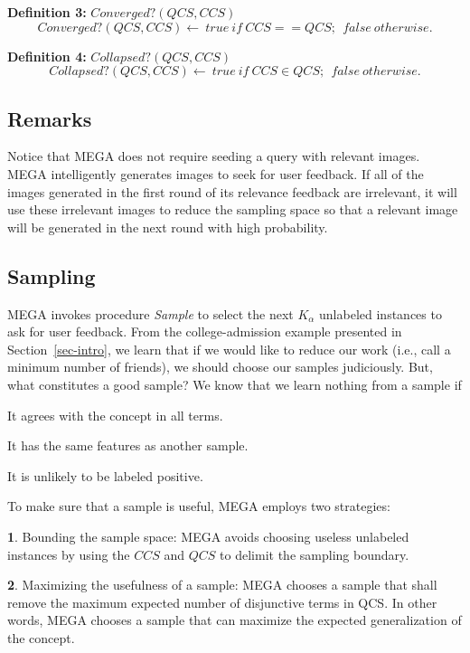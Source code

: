\vspace{.1in}
\sspace
\noindent
{\bf Definition 3:} $Converged?(QCS, CCS)$
\[
Converged?(QCS, CCS) \leftarrow~true~if~CCS == QCS;~~false~otherwise.
\]

\noindent
{\bf Definition 4:} $Collapsed?(QCS, CCS)$
\[
Collapsed?(QCS, CCS) \leftarrow~true~if~CCS \in QCS;~~false~otherwise.
\]
\nspace

\subsection*{Remarks}

Notice that MEGA does not require seeding a
query with relevant images.  MEGA intelligently generates
images to seek for user feedback.
If all of the images
generated in the first round of its relevance feedback are irrelevant,
it will use these irrelevant images to reduce
the sampling space
so that a relevant image will be
generated in the next round with high probability.
                                                      

\subsection{Sampling}
\label{sec-sampling}

MEGA invokes procedure {\it Sample}
to select the next $K_{\alpha}$ unlabeled instances
to ask for user feedback. From the 
college-admission example presented in Section~\ref{sec-intro}, we
learn that if we would like to reduce our work (i.e.,
call a minimum number of friends), we should choose
our samples judiciously. 
But, what constitutes a good sample?  We know that we
learn nothing from a sample if
\begin{jlist}
\item It agrees with the concept in all terms.
\item It has the same features as another sample.
\item It is unlikely to be labeled positive.
\end{jlist}

To make sure that a sample is useful, MEGA employs two strategies:
\begin{nlist}
\item {\bf 1}. Bounding the sample space:
MEGA avoids choosing useless unlabeled instances by using
the $CCS$ and $QCS$ to delimit the sampling boundary. 
\item {\bf 2}. Maximizing the usefulness of a sample:
MEGA chooses a sample that
shall remove the maximum expected number of disjunctive
terms in QCS. In other words, MEGA chooses a sample
that can maximize the expected generalization of the concept.
\end{nlist}

